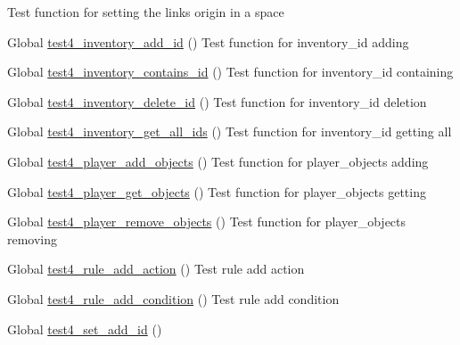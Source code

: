 \begin{DoxyRefList}
%
Test function for setting the link\textquotesingle{}s origin in a space  
\item[Global \mbox{\hyperlink{inventory__test_8c_a967d37c163cbf8ea9335b506c1713f4a}{test4\+\_\+inventory\+\_\+add\+\_\+id}} ()]\label{test__test000421}%
%
Test function for inventory\+\_\+id adding  
\item[Global \mbox{\hyperlink{inventory__test_8c_afe5759e3852e9bc9c6acd55a83c65d9d}{test4\+\_\+inventory\+\_\+contains\+\_\+id}} ()]\label{test__test000433}%
%
Test function for inventory\+\_\+id containing  
\item[Global \mbox{\hyperlink{inventory__test_8c_a649d9f107a2bb4306c437469eac4e500}{test4\+\_\+inventory\+\_\+delete\+\_\+id}} ()]\label{test__test000426}%
%
Test function for inventory\+\_\+id deletion  
\item[Global \mbox{\hyperlink{inventory__test_8c_a0ad31e5b123ca3712838f63e9c2a473e}{test4\+\_\+inventory\+\_\+get\+\_\+all\+\_\+ids}} ()]\label{test__test000437}%
%
Test function for inventory\+\_\+id getting all  
\item[Global \mbox{\hyperlink{player__test_8c_a613aa43b22ac91b58686cfb89d0b70c4}{test4\+\_\+player\+\_\+add\+\_\+objects}} ()]\label{test__test000559}%
%
Test function for player\+\_\+objects adding  
\item[Global \mbox{\hyperlink{player__test_8c_a4e35523e285f3e5370a93a7d09b447d3}{test4\+\_\+player\+\_\+get\+\_\+objects}} ()]\label{test__test000555}%
%
Test function for player\+\_\+objects getting  
\item[Global \mbox{\hyperlink{player__test_8c_afc72a66e7c55782af039e5a0616404e5}{test4\+\_\+player\+\_\+remove\+\_\+objects}} ()]\label{test__test000566}%
%
Test function for player\+\_\+objects removing  
\item[Global \mbox{\hyperlink{rule__test_8c_a93d7e7d2acec3bbdde3c8fd1742f6491}{test4\+\_\+rule\+\_\+add\+\_\+action}} ()]\label{test__test000628}%
%
Test rule add action  
\item[Global \mbox{\hyperlink{rule__test_8c_a4176f852767abbe825f66516782af6d2}{test4\+\_\+rule\+\_\+add\+\_\+condition}} ()]\label{test__test000622}%
%
Test rule add condition  
\item[Global \mbox{\hyperlink{set__test_8c_ac54a13103c3fdb531493d0d8062dbb60}{test4\+\_\+set\+\_\+add\+\_\+id}} ()]\label{test__test000638}%

\end{DoxyRefList}
